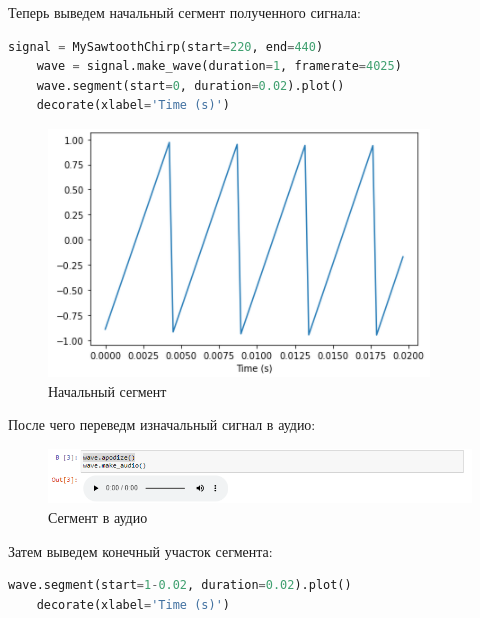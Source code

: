\documentclass[a4paper]{article}
\begin{document}
            Теперь выведем начальный сегмент полученного сигнала:
            
\begin{lstlisting}[language=Python, caption= Получение начального сегмента]
    signal = MySawtoothChirp(start=220, end=440)
    wave = signal.make_wave(duration=1, framerate=4025)
    wave.segment(start=0, duration=0.02).plot() 
    decorate(xlabel='Time (s)')
\end{lstlisting}               
            
            \begin{figure}[H]
                \centering
                \includegraphics{ex_2_segment_begin.png}
                \caption{Начальный сегмент}
                \label{fig:ex_2_segment_begin}
            \end{figure}
            
            После чего переведм изначальный сигнал в аудио:
            
            \begin{figure}[H]
                \centering
                \includegraphics[width=\textwidth]{ex_2_wave_audio.png}
                \caption{Сегмент в аудио}
                \label{fig:ex_2_wave_audio}
            \end{figure}
            
            Затем выведем конечный участок сегмента:
            
\begin{lstlisting}[language=Python, caption= Получение конечного сегмента]
    wave.segment(start=1-0.02, duration=0.02).plot()
    decorate(xlabel='Time (s)')
\end{lstlisting}               
            
\end{document}
